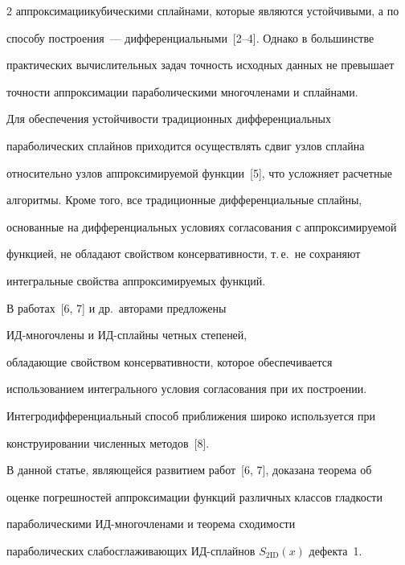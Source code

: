\begin{multicols}{2}
аппроксимации\linebreak кубическими сплайнами, которые являются устойчивыми, а по 


способу построения~--- дифференциальными~[2--4]. Однако в большинстве 


практических вычислительных задач точность исходных данных не превышает 


точности аппроксимации параболическими многочленами и сплайнами. 


  


  Для обеспечения устойчивости традиционных дифференциальных 


параболических сплайнов приходится осуществлять сдвиг узлов сплайна 


относительно узлов аппроксимируемой функции~[5], что усложняет расчетные 


алгоритмы. Кроме того, все традиционные дифференциальные сплайны, 


основанные на дифференциальных условиях согласования с аппроксимируемой 


функцией, не обладают свойством консервативности, т.\,е.\ не сохраняют 


интегральные свойства аппроксимируемых функций.


  


  В работах~[6, 7] и др.\ авторами предложены 


ИД-мно\-го\-чле\-ны и ИД-сплай\-ны четных степеней, 


обладающие свойством консервативности, которое обеспечивается 


использованием интегрального условия согласования при их построении. 


Интегродифференциальный способ приближения широко используется при 


конструировании численных методов~[8]. 


  


  В данной статье, являющейся развитием работ~[6, 7], доказана теорема об 


оценке погрешностей аппроксимации функций различных классов гладкости 


параболическими ИД-мно\-го\-чле\-на\-ми и теорема сходимости 


параболических слабосглаживающих ИД-сплай\-нов $S_{2\mathrm{ID}}(x)$ дефекта~1.



\end{multicols}
